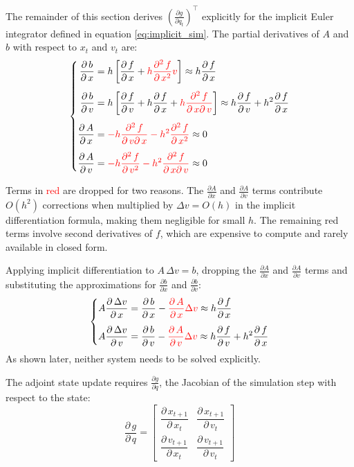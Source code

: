 \documentclass{article}
\newcommand{\pd}[2]{\dfrac{\partial\, #1}{\partial\, #2}}
\newcommand{\pdc}[2]{\frac{\partial #1}{\partial #2}}
\newcommand{\pdv}[2]{\dfrac{\partial^2\, #1}{\partial\, #2^2}}
\newcommand{\pdm}[3]{\dfrac{\partial^2\, #1}{\partial\, #2 \partial\, #3}}
\newcommand{\drop}[1]{\textcolor{red}{#1}}
\begin{document}
The remainder of this section derives $(\pdc{g}{q_t})^\top$ explicitly for the implicit Euler integrator defined in equation \ref{eq:implicit_sim}. The partial derivatives of $A$ and $b$ with respect to $x_t$ and $v_t$ are:
\begin{equation}
    \left\{
    \begin{aligned}
        \pd{b}{x} &= 
        h \left[ 
              \pd{f}{x} + 
            \drop{h \pdv{f}{x} v}
        \right] \approx h \pd{f}{x} \\[1ex]
        \pd{b}{v} &= 
        h \left[ 
              \pd{f}{v} + 
            h \pd{f}{x} + 
            \drop{h \pdm{f}{x}{v}}
        \right] \approx h \pd{f}{v} + h^2 \pd{f}{x}\\[1ex]
        \pd{A}{x} &=
            \drop{- h \pdm{f}{v}{x} - h^2 \pdv{f}{x}} \approx 0\\[1ex]
        \pd{A}{v} &=
            \drop{- h \pdv{f}{v} - h^2 \pdm{f}{x}{v}} \approx 0
    \end{aligned}
    \right.
\end{equation}

Terms in \textcolor{red}{red} are dropped for two reasons. The $\frac{\partial A}{\partial x}$ and $\frac{\partial A}{\partial v}$ terms contribute $O(h^2)$ corrections when multiplied by $\Delta v = O(h)$ in the implicit differentiation formula, making them negligible for small $h$. The remaining red terms involve second derivatives of $f$, which are expensive to compute and rarely available in closed form.

Applying implicit differentiation to $A\,\Delta v = b$, dropping the $\frac{\partial A}{\partial x}$ 
and $\frac{\partial A}{\partial v}$ terms and substituting the approximations for 
$\frac{\partial b}{\partial x}$ and $\frac{\partial b}{\partial v}$:
\begin{equation}
\label{eq:deltav_dv_dx}
    \left\{
    \begin{aligned}
    & A \pd{\Delta v}{x} = \pd{b}{x} - \drop{\pd{A}{x}\Delta v} \approx h \pd{f}{x} \\[1ex]
    & A \pd{\Delta v}{v} = \pd{b}{v} - \drop{\pd{A}{v}\Delta v} \approx h \pd{f}{v} + h^2 \pd{f}{x}
    \end{aligned}
    \right.
\end{equation}
As shown later, neither system needs to be solved explicitly.

The adjoint state update requires $\frac{\partial g}{\partial q}$, the Jacobian of the simulation step with respect to the state:
\begin{equation}
    \pd{g}{q} = 
    \begin{bmatrix}
        \pd{x_{t+1}}{x_t} & \pd{x_{t+1}}{v_t} \\[1.5ex]
        \pd{v_{t+1}}{x_t} & \pd{v_{t+1}}{v_t}
    \end{bmatrix}
\end{equation}
\end{document}
